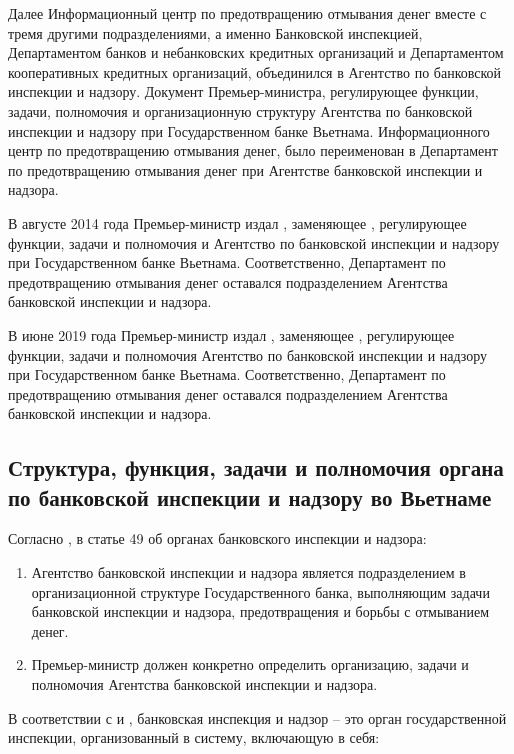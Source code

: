 \documentclass{article}
\begin{document}
Далее Информационный центр по предотвращению отмывания денег вместе с тремя другими подразделениями, а именно Банковской инспекцией, Департаментом банков и небанковских кредитных организаций и Департаментом кооперативных кредитных организаций, объединился в Агентство по банковской инспекции и надзору. Документ \cite{qdttg8309} Премьер-министра, регулирующее функции, задачи, полномочия и организационную структуру Агентства по банковской инспекции и надзору при Государственном банке Вьетнама. Информационного центр по предотвращению отмывания денег, было переименован в Департамент по предотвращению отмывания денег при Агентстве банковской инспекции и надзора.

В августе 2014 года Премьер-министр издал \cite{qdttg3514}, заменяющее \cite{qdttg8309}, регулирующее функции, задачи и полномочия и Агентство по банковской инспекции и  надзору при Государственном банке Вьетнама. Соответственно, Департамент по предотвращению отмывания денег оставался подразделением Агентства банковской инспекции и надзора.

В июне 2019 года Премьер-министр издал \cite{qdttg2019}, заменяющее \cite{qdttg3514}, регулирующее функции, задачи и полномочия Агентство по банковской инспекции и надзору при Государственном банке Вьетнама. Соответственно, Департамент по предотвращению отмывания денег оставался подразделением Агентства банковской инспекции и надзора.

\hfill

\subsection{Структура, функция, задачи и полномочия органа по банковской инспекции и надзору во Вьетнаме}

Согласно \cite{law46}, в статье 49 об органах банковского инспекции и надзора:

\begin{enumerate}
  \item Агентство банковской инспекции и надзора является подразделением в организационной структуре Государственного банка, выполняющим задачи банковской инспекции и надзора, предотвращения и борьбы с отмыванием денег.
  \item Премьер-министр должен конкретно определить организацию, задачи и полномочия Агентства банковской инспекции и надзора.
\end{enumerate}

В соответствии с \cite{ndcp2614} и \cite{ndcp4319}, банковская инспекция и надзор -- это орган государственной инспекции, организованный в систему, включающую в себя:
\end{document}

